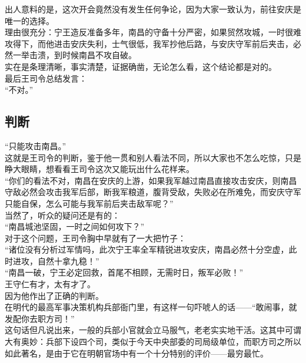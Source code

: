 \begin{multicols}{\theparacolNo}
出人意料的是，这次开会竟然没有发生任何争论，因为大家一致认为，前往安庆是唯一的选择。\\

理由很充分：宁王造反准备多年，南昌的守备十分严密，如果贸然攻城，一时很难攻得下，而他进击安庆失利，士气很低，我军抄他后路，与安庆守军前后夹击，必然一举击溃，到时候南昌不攻自破。\\

实在是条理清晰，事实清楚，证据确凿，无论怎么看，这个结论都是对的。\\

最后王司令总结发言：\\

“不对。”\\

\subsection{判断}
“只能攻击南昌。”\\

这就是王司令的判断，鉴于他一贯和别人看法不同，所以大家也不怎么吃惊，只是睁大眼睛，想看看王司令这次又能玩出什么花样来。\\

“你们的看法不对，南昌在安庆的上游，如果我军越过南昌直接攻击安庆，则南昌守敌必然会攻击我军后部，断我军粮道，腹背受敌，失败必在所难免，而安庆守军只能自保，怎么可能与我军前后夹击敌军呢？”\\

当然了，听众的疑问还是有的：\\

“南昌城池坚固，一时之间如何攻下？”\\

对于这个问题，王司令胸中早就有了一大把竹子：\\

“诸位没有分析过军情吗，此次宁王率全军精锐进攻安庆，南昌必然十分空虚，此时进攻，自然十拿九稳！”\\

“南昌一破，宁王必定回救，首尾不相顾，无需时日，叛军必败！”\\

王守仁有才，太有才了。\\

因为他作出了正确的判断。\\

在明代的最高军事决策机构兵部衙门里，有这样一句吓唬人的话——“敢闹事，就发配你去职方司！”\\

这句话但凡说出来，一般的兵部小官就会立马服气，老老实实地干活。这其中可谓大有奥妙：兵部下设四个司，类似于今天中央部委的司局级单位，而职方司之所以如此著名，是由于它在明朝官场中有一个十分特别的评价——最穷最忙。\\


\end{multicols}

